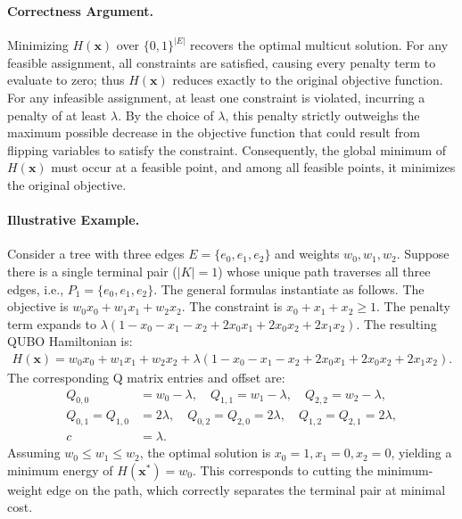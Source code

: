 \documentclass[12pt]{article}
\begin{document}
\paragraph{Correctness Argument.}
Minimizing $H(\mathbf{x})$ over $\{0,1\}^{|E|}$ recovers the optimal multicut solution. For any feasible assignment, all constraints are satisfied, causing every penalty term to evaluate to zero; thus $H(\mathbf{x})$ reduces exactly to the original objective function. For any infeasible assignment, at least one constraint is violated, incurring a penalty of at least $\lambda$. By the choice of $\lambda$, this penalty strictly outweighs the maximum possible decrease in the objective function that could result from flipping variables to satisfy the constraint. Consequently, the global minimum of $H(\mathbf{x})$ must occur at a feasible point, and among all feasible points, it minimizes the original objective.

\paragraph{Illustrative Example.}
Consider a tree with three edges $E = \{e_0, e_1, e_2\}$ and weights $w_0, w_1, w_2$. Suppose there is a single terminal pair ($|K|=1$) whose unique path traverses all three edges, i.e., $P_1 = \{e_0, e_1, e_2\}$. The general formulas instantiate as follows. The objective is $w_0 x_0 + w_1 x_1 + w_2 x_2$. The constraint is $x_0 + x_1 + x_2 \ge 1$. The penalty term expands to $\lambda(1 - x_0 - x_1 - x_2 + 2x_0x_1 + 2x_0x_2 + 2x_1x_2)$. The resulting QUBO Hamiltonian is:
\begin{align}
    H(\mathbf{x}) = w_0 x_0 + w_1 x_1 + w_2 x_2 + \lambda(1 - x_0 - x_1 - x_2 + 2x_0x_1 + 2x_0x_2 + 2x_1x_2).
\end{align}
The corresponding Q matrix entries and offset are:
\begin{align}
    Q_{0,0} &= w_0 - \lambda, \quad Q_{1,1} = w_1 - \lambda, \quad Q_{2,2} = w_2 - \lambda, \\
    Q_{0,1} = Q_{1,0} &= 2\lambda, \quad Q_{0,2} = Q_{2,0} = 2\lambda, \quad Q_{1,2} = Q_{2,1} = 2\lambda, \\
    c &= \lambda.
\end{align}
Assuming $w_0 \le w_1 \le w_2$, the optimal solution is $x_0 = 1, x_1 = 0, x_2 = 0$, yielding a minimum energy of $H(\mathbf{x}^*) = w_0$. This corresponds to cutting the minimum-weight edge on the path, which correctly separates the terminal pair at minimal cost.
\end{document}

